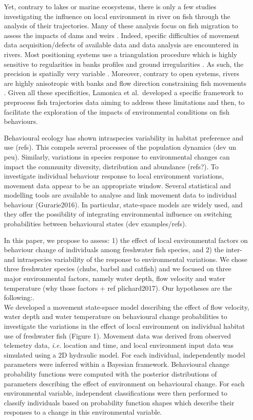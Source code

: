 \documentclass[
  letterpaper,
  DIV=11,
  numbers=noendperiod]{scrartcl}
\begin{document}
Yet, contrary to lakes or marine ecosystems, there is only a few studies
investigating the influence on local environment in river on fish
through the analysis of their trajectories. Many of these analysis focus
on fish migration to assess the impacts of dams and weirs . Indeed,
specific difficulties of movement data acquisition/defects of available
data and data analysis are encountered in rivers. Most positioning
systems use a triangulation procedure which is highly sensitive to
regularities in banks profiles and ground irregularities . As such, the
precision is spatially very variable . Moreover, contrary to open
systems, rivers are highly anisotropic with banks and flow direction
constraining fish movements . Given all these specificities, Lamonica et
al.~developed a specific framework to preprocess fish trajectories data
aiming to address these limitations and then, to facilitate the
exploration of the impacts of environmental conditions on fish
behaviours.

Behavioural ecology has shown intraspecies variability in habitat
preference and use (refs). This compels several processes of the
population dynamics (dev un peu). Similarly, variations in species
response to environmental changes can impact the community diversity,
distribution and abundance (refs?). To investigate individual behaviour
response to local environment variations, movement data appear to be an
appropriate window. Several statistical and modelling tools are
available to analyse and link movement data to individual behaviour
(Gurarie2016). In particular, state-space models are widely used, and
they offer the possibility of integrating environmental influence on
switching probabilities between behavioural states (dev examples/refs).

In this paper, we propose to assess: 1) the effect of local
environmental factors on behaviour change of individuals among
freshwater fish species, and 2) the inter- and intraspecies variability
of the response to environmental variations. We chose three freshwater
species (chubs, barbel and catfish) and we focused on three major
environmental factors, namely water depth, flow velocity and water
temperature (why those factors + ref plichard2017). Our hypotheses are
the following:.\\
We developed a movement state-space model describing the effect of flow
velocity, water depth and water temperature on behavioural change
probabilities to investigate the variations in the effect of local
environment on individual habitat use of freshwater fish (Figure 1).
Movement data was derived from observed telemetry data, \emph{i.e.}
location and time, and local environment input data was simulated using
a 2D hydraulic model. For each individual, independently model
parameters were inferred within a Bayesian framework. Behavioural change
probability functions were computed with the posterior distributions of
parameters describing the effect of environment on behavioural change.
For each environmental variable, independent classifications were then
performed to classify individuals based on probability function shapes
which describe their responses to a change in this environmental
variable.\\
\end{document}
